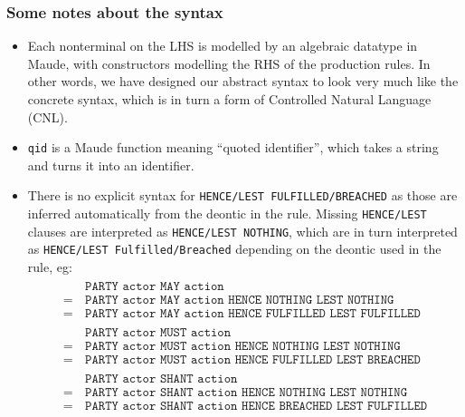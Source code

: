 \documentclass{article}
\begin{document}
\subsubsection{Some notes about the syntax}
\begin{itemize}
  \item
  Each nonterminal on the LHS is modelled by an algebraic datatype in Maude, with
  constructors modelling the RHS of the production rules.
  In other words, we have designed our abstract syntax to look very much like
  the concrete syntax, which is in turn a form of Controlled Natural Language (CNL).
  \item
  \texttt{qid} is a Maude function meaning ``quoted identifier'', which
  takes a string and turns it into an identifier.

  \item
  There is no explicit syntax for \texttt{HENCE/LEST FULFILLED/BREACHED} as
  those are inferred automatically from the deontic in the rule.
  Missing \texttt{HENCE/LEST} clauses are interpreted as
  \texttt{HENCE/LEST NOTHING}, which are in turn interpreted as
  \texttt{HENCE/LEST Fulfilled/Breached} depending on the deontic used in the
  rule, eg:
  \begin{align*}
    \begin{split}
      & \texttt{PARTY actor MAY action} \\
      = \, & \texttt{PARTY actor MAY action HENCE NOTHING LEST NOTHING} \\
      = \, & \texttt{PARTY actor MAY action HENCE FULFILLED LEST FULFILLED}
    \end{split}
    \\
    \begin{split}
      & \texttt{PARTY actor MUST action} \\
      = \, & \texttt{PARTY actor MUST action HENCE NOTHING LEST NOTHING} \\
      = \, & \texttt{PARTY actor MUST action HENCE FULFILLED LEST BREACHED}
    \end{split}
    \\
    \begin{split}
      & \texttt{PARTY actor SHANT action} \\
      = \, & \texttt{PARTY actor SHANT action HENCE NOTHING LEST NOTHING} \\
      = \, & \texttt{PARTY actor SHANT action HENCE BREACHED LEST FULFILLED}
    \end{split}
  \end{align*}
\end{itemize}
\end{document}
